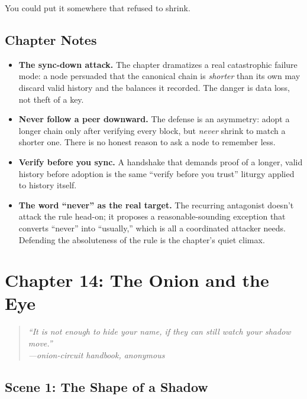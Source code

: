 \documentclass[12pt,letterpaper]{book}
\providecommand{\tightlist}{\setlength{\itemsep}{0pt}\setlength{\parskip}{0pt}}
\begin{document}
You could put it somewhere that refused to shrink.

\hypertarget{chapter-13-notes}{%
\subsection{Chapter Notes}\label{chapter-13-notes}}

\begin{itemize}
\tightlist
\item
  \textbf{The sync-down attack.} The chapter dramatizes a real catastrophic
  failure mode: a node persuaded that the canonical chain is \emph{shorter} than
  its own may discard valid history and the balances it recorded. The danger is
  data loss, not theft of a key.
\item
  \textbf{Never follow a peer downward.} The defense is an asymmetry: adopt a
  longer chain only after verifying every block, but \emph{never} shrink to match
  a shorter one. There is no honest reason to ask a node to remember less.
\item
  \textbf{Verify before you sync.} A handshake that demands proof of a longer,
  valid history before adoption is the same ``verify before you trust'' liturgy
  applied to history itself.
\item
  \textbf{The word ``never'' as the real target.} The recurring antagonist
  doesn't attack the rule head-on; it proposes a reasonable-sounding exception
  that converts ``never'' into ``usually,'' which is all a coordinated attacker
  needs. Defending the absoluteness of the rule is the chapter's quiet climax.
\end{itemize}


\hypertarget{chapter-14-the-onion-and-the-eye}{%
\section{Chapter 14: The Onion and the
Eye}\label{chapter-14-the-onion-and-the-eye}}

\begin{quote}
\itshape ``It is not enough to hide your name, if they can still watch your shadow
move.''\\
\normalfont\hfill---onion-circuit handbook, anonymous
\end{quote}

\hypertarget{scene-1-the-shape-of-a-shadow}{%
\subsection{Scene 1: The Shape of a
Shadow}\label{scene-1-the-shape-of-a-shadow}}
\end{document}
